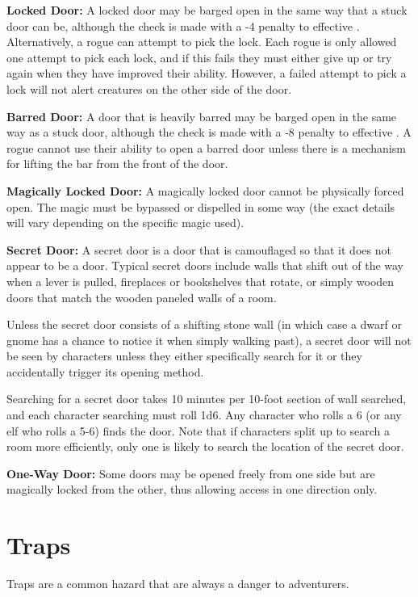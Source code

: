 \begin{multicols*}{2}
\textbf{Locked Door:} A locked door may be barged open in the same way that a stuck door can be, although the  check is made with a -4 penalty to effective . Alternatively, a rogue can attempt to pick the lock. Each rogue is only allowed one attempt to pick each lock, and if this fails they must either give up or try again when they have improved their  ability. However, a failed attempt to pick a lock will not alert creatures on the other side of the door.

\textbf{Barred Door:} A door that is heavily barred may be barged open in the same way as a stuck door, although the  check is made with a -8 penalty to effective . A rogue cannot use their  ability to open a barred door unless there is a mechanism for lifting the bar from the front of the door.

\textbf{Magically Locked Door:} A magically locked door cannot be physically forced open. The magic must be bypassed or dispelled in some way (the exact details will vary depending on the specific magic used).

\textbf{Secret Door:} A secret door is a door that is camouflaged so that it does not appear to be a door. Typical secret doors include walls that shift out of the way when a lever is pulled, fireplaces or bookshelves that rotate, or simply wooden doors that match the wooden paneled walls of a room.

Unless the secret door consists of a shifting stone wall (in which case a dwarf or gnome has a chance to notice it when simply walking past), a secret door will not be seen by characters unless they either specifically search for it or they accidentally trigger its opening method.

Searching for a secret door takes 10 minutes per 10-foot section of wall searched, and each character searching must roll 1d6. Any character who rolls a 6 (or any elf who rolls a 5-6) finds the door. Note that if characters split up to search a room more efficiently, only one is likely to search the location of the secret door.

\textbf{One-Way Door:} Some doors may be opened freely from one side but are magically locked from the other, thus allowing access in one direction only.

\section{Traps}
Traps are a common hazard that are always a danger to adventurers.


\end{multicols*}
